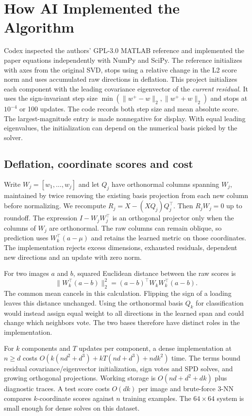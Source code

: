 \section{How AI Implemented the Algorithm}

Codex inspected the authors' GPL-3.0 MATLAB reference \citep{matlab} and implemented the paper equations independently with NumPy and SciPy. The reference initializes with axes from the original SVD, stops using a relative change in the L2 score norm and uses accumulated raw directions in deflation. This project initializes each component with the leading covariance eigenvector of the \emph{current residual}. It uses the sign-invariant step size $\min(\|w^+-w\|_2,\|w^++w\|_2)$ and stops at $10^{-4}$ or 100 updates. The code records both step size and mean absolute score. The largest-magnitude entry is made nonnegative for display. With equal leading eigenvalues, the initialization can depend on the numerical basis picked by the solver.

\subsection{Deflation, coordinate scores and cost}

Write $W_j=[w_1,\ldots,w_j]$ and let $Q_j$ have orthonormal columns spanning $W_j$, maintained by twice removing the existing basis projection from each new column before normalizing. We recompute \(R_j=X-(XQ_j)Q_j^\top\). Then $R_j W_j=0$ up to roundoff. The expression $I-W_jW_j^\top$ is an orthogonal projector only when the columns of $W_j$ are orthonormal. The raw columns can remain oblique, so prediction uses $W_k^\top(a-\mu)$ and retains the learned metric on those coordinates. The implementation rejects excess dimensions, exhausted residuals, dependent new directions and an update with zero norm.

For two images $a$ and $b$, squared Euclidean distance between the raw scores is
\[
 \|W_k^\top(a-b)\|_2^2=(a-b)^\top W_kW_k^\top(a-b).
\]
The common mean cancels in this calculation. Flipping the sign of a loading leaves this distance unchanged. Using the orthonormal basis $Q_k$ for classification would instead assign equal weight to all directions in the learned span and could change which neighbors vote. The two bases therefore have distinct roles in the implementation.

For $k$ components and $T$ updates per component, a dense implementation at $n\ge d$ costs $O\!\left(k(nd^2+d^3)+kT(nd+d^3)+ndk^2\right)$ time. The terms bound residual covariance/eigenvector initialization, sign votes and SPD solves, and growing orthogonal projections. Working storage is $O(nd+d^2+dk)$ plus diagnostic traces. A test score costs $O(dk)$ per image and brute-force 3-NN compares $k$-coordinate scores against $n$ training examples. The $64\times64$ system is small enough for dense solves on this dataset.

